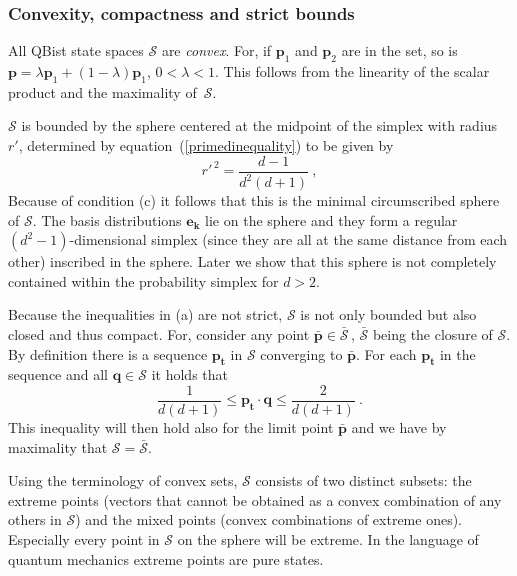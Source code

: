 \documentclass[letterpaper,11pt]{article}
\begin{document}
\subsubsection{Convexity, compactness and strict bounds} %

\indent \indent
All QBist state spaces $\mathcal{S}$ are \emph{convex}. For, if $\mathbf p_1$ and $\mathbf p_2$ are in the set, so is $\mathbf p=\lambda \mathbf p_1+(1-\lambda) \mathbf p_1$, $0<\lambda<1$. This follows from the linearity of the scalar product and the maximality of~$\mathcal{S}$.

$\mathcal{S}$ is bounded by the sphere centered at the midpoint of the simplex with radius~$r'$, determined by equation~(\ref{primedinequality}) to be given by
%
\begin{equation} \label{radius}
    r'^{\,2} = \frac{d-1}{d^2(d+1)} \ ,
\end{equation}
%
Because of condition (c) it follows that this is the minimal circumscribed sphere of $\mathcal{S}$. The basis distributions $\mathbf{e_k}$  lie on the sphere and they form a regular $(d^2-1)$-dimensional simplex (since they are all at the same distance from each other) inscribed in the sphere. Later we show that this sphere is not completely contained within the probability simplex for $d>2$.

Because the inequalities in (a) are not strict, $\mathcal{S}$ is not only bounded but also closed and thus compact. For, consider any point $\bar{\mathbf p}\in\bar{\mathcal S}\,$, $\bar{\mathcal S}$ being the closure of $\mathcal S$. By definition there is a sequence $\mathbf{p_t}$ in $\mathcal S$ converging to  $\bar{\mathbf p}$. For each $\mathbf{p_t}$ in the sequence and all $\mathbf q \in \mathcal S$ it holds that
%
\begin{equation}
   \frac{1}{d(d+1)} \leq \mathbf{p_t\cdot q} \leq \frac{2}{d(d+1)} \ .
\end{equation}
%
This inequality will then hold also for the limit point $\bar{\mathbf p}$ and we have by maximality that $\mathcal S=\bar{\mathcal S}$.

Using the terminology of convex sets, $\mathcal{S}$ consists of two distinct subsets: the extreme points (vectors that cannot be obtained as a convex combination of any others in $\mathcal{S}$) and the mixed points (convex combinations of extreme ones). Especially every point in $\mathcal{S}$ on the sphere will be extreme. In the language of quantum mechanics extreme points are pure states.
\end{document}
